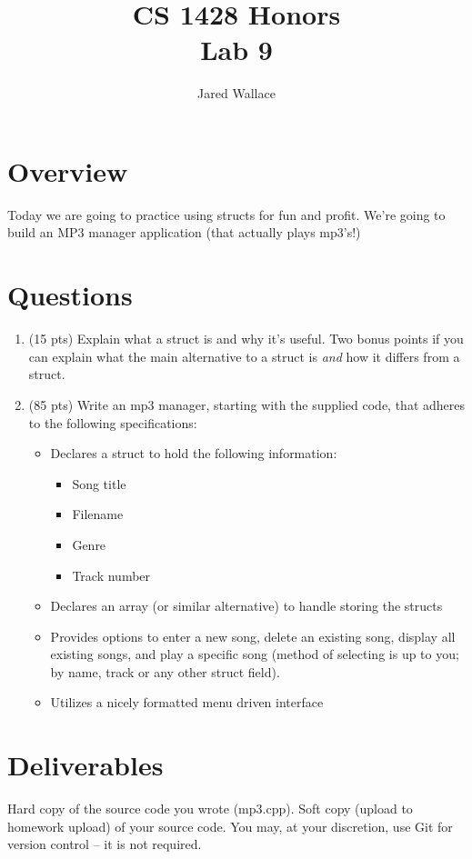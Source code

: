 \documentclass[letterpaper,12pt]{article}
\title{\Large CS 1428 Honors\\Lab 9}
\author{Jared Wallace}
\date{}
\begin{document}
\maketitle

\vspace{30mm}

\section*{Overview}
Today we are going to practice using structs for fun and profit. We're
going to build an MP3 manager application (that actually plays mp3's!)
\section*{Questions}
\begin{enumerate}
    \item (15 pts) Explain what a struct is and why it's useful. Two bonus points if
        you can explain what the main alternative to a struct is \emph{and} how
        it differs from a struct.
    \vspace{40mm}
    \item (85 pts) Write an mp3 manager, starting with the supplied code, that
        adheres to the following specifications:
    \begin{itemize}
        \item Declares a struct to hold the following information:
            \begin{itemize}
                \item Song title
                \item Filename
                \item Genre
                \item Track number
            \end{itemize}
        \item Declares an array (or similar alternative) to handle storing the structs
        \item Provides options to enter a new song, delete an existing song, display
            all existing songs, and play a specific song (method of selecting is up to you;
            by name, track or any other struct field).
        \item Utilizes a nicely formatted menu driven interface
    \end{itemize}
\end{enumerate}
\section*{Deliverables}
Hard copy of the source code you wrote (mp3.cpp). Soft copy (upload to homework upload) of
your source code. You may, at your discretion, use Git for version control -- it is not required.
\end{document}
